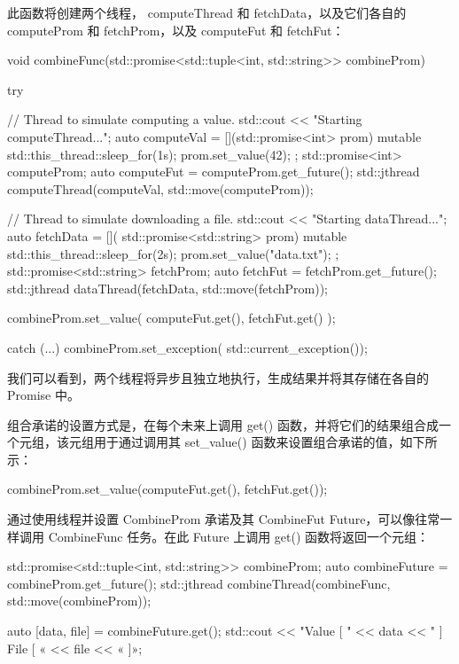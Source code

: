 此函数将创建两个线程， computeThread 和 fetchData，以及它们各自的 computeProm 和 fetchProm，以及 computeFut 和 fetchFut：

\begin{cpp}
void combineFunc(std::promise<std::tuple<int,
                 std::string>> combineProm) {
    try {
        // Thread to simulate computing a value.
        std::cout << "Starting computeThread...\n";
        auto computeVal = [](std::promise<int> prom)
                             mutable {
            std::this_thread::sleep_for(1s);
            prom.set_value(42);
        };
        std::promise<int> computeProm;
        auto computeFut = computeProm.get_future();
        std::jthread computeThread(computeVal,
                                std::move(computeProm));

        // Thread to simulate downloading a file.
        std::cout << "Starting dataThread...\n";
        auto fetchData = [](
        std::promise<std::string> prom) mutable {
            std::this_thread::sleep_for(2s);
            prom.set_value("data.txt");
        };
        std::promise<std::string> fetchProm;
        auto fetchFut = fetchProm.get_future();
        std::jthread dataThread(fetchData,
                                std::move(fetchProm));

        combineProm.set_value({
            computeFut.get(),
            fetchFut.get()
        });
    } catch (...) {
        combineProm.set_exception(
                    std::current_exception());
    }
}
\end{cpp}

我们可以看到，两个线程将异步且独立地执行，生成结果并将其存储在各自的 Promise 中。

组合承诺的设置方式是，在每个未来上调用 get() 函数，并将它们的结果组合成一个元组，该元组用于通过调用其 set\_value() 函数来设置组合承诺的值，如下所示：

\begin{cpp}
combineProm.set_value({computeFut.get(), fetchFut.get()});
\end{cpp}

通过使用线程并设置 CombineProm 承诺及其 CombineFut Future，可以像往常一样调用 CombineFunc 任务。在此 Future 上调用 get() 函数将返回一个元组：

\begin{cpp}
std::promise<std::tuple<int, std::string>> combineProm;
auto combineFuture = combineProm.get_future();
std::jthread combineThread(combineFunc,
                           std::move(combineProm));

auto [data, file] = combineFuture.get();
std::cout << "Value [ " << data
          << " ] File [ « << file << « ]\n»;
\end{cpp}

